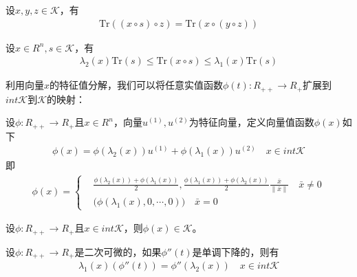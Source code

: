         \begin{lemma}
        设$x,y,z\in \mathcal{K}$，有
        \begin{align*}
        \mathrm{Tr}((x\circ s)\circ z)=\mathrm{Tr}(x\circ (y\circ z))
        \end{align*}
        \end{lemma}
        \begin{lemma}
        设$x\in R^n,s\in \mathcal{K}$，有
         \begin{align*}
        {\lambda}_2(x)\mathrm{Tr}(s) \leqslant \mathrm{Tr}(x\circ s) \leqslant {\lambda}_1(x)\mathrm{Tr}(s)
        \end{align*}
        \end{lemma}
        \par
        利用向量$x$的特征值分解，我们可以将任意实值函数$\phi(t):R_{++}\to R_{+}$扩展到$int{}\mathcal{K}$到$\mathcal{K}$的映射：
        \par
        \begin{definition}
        设$\phi:R_{++}\to R_{+}$且$x \in R^n$，向量$u^{(1)},u^{(2)}$为特征向量，定义向量值函数$\phi(x)$如下
        \begin{align*}
        \phi(x)=\phi({\lambda}_2(x)) u^{(1)}+\phi({\lambda}_1(x))u^{(2)}\quad x\in int{}\mathcal{K}
        \end{align*}
        即
         \begin{align*}
         \phi(x)=\left\{
        \begin{aligned}
        & \frac{\phi({\lambda}_2(x))+\phi({\lambda}_1(x))}{2},\frac{\phi({\lambda}_1(x))+\phi({\lambda}_2(x))}{2} \frac{\bar{x}}{\|\bar{x}\|}\quad \bar{x} \neq 0\\
        & ({\phi({\lambda}_1(x),0,\cdots,0))}\quad \bar{x} = 0
        \end{aligned}
         \right.
        \end{align*}
        \end{definition}
          \begin{lemma}
          设$\phi:R_{++}\to R_{+}$且$x \in int{}\mathcal{K}$，则$\phi(x)\in \mathcal{K}$。
          \end{lemma}
          \begin{lemma}
          设$\phi:R_{++}\to R_{+}$是二次可微的，如果${\phi}''(t)$是单调下降的，则有
          \begin{align*}
         {\lambda}_1(x)({\phi}''(t)) = {\phi}''({\lambda}_2(x)) \quad x \in int{}\mathcal{K}
        \end{align*}
        \end{lemma}
